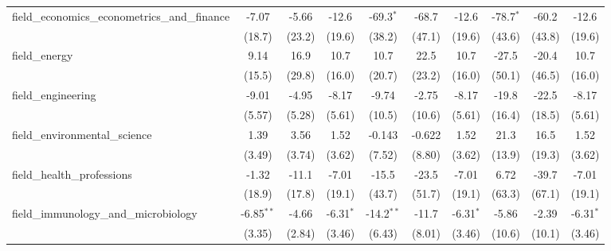 \begin{tabular}{lccccccccc}
   field\_economics\_econometrics\_and\_finance                & -7.07         & -5.66         & -12.6         & -69.3$^{*}$  & -68.7        & -12.6         & -78.7$^{*}$  & -60.2   & -12.6\\   
                                                               & (18.7)        & (23.2)        & (19.6)        & (38.2)       & (47.1)       & (19.6)        & (43.6)       & (43.8)  & (19.6)\\   
   field\_energy                                               & 9.14          & 16.9          & 10.7          & 10.7         & 22.5         & 10.7          & -27.5        & -20.4   & 10.7\\   
                                                               & (15.5)        & (29.8)        & (16.0)        & (20.7)       & (23.2)       & (16.0)        & (50.1)       & (46.5)  & (16.0)\\   
   field\_engineering                                          & -9.01         & -4.95         & -8.17         & -9.74        & -2.75        & -8.17         & -19.8        & -22.5   & -8.17\\   
                                                               & (5.57)        & (5.28)        & (5.61)        & (10.5)       & (10.6)       & (5.61)        & (16.4)       & (18.5)  & (5.61)\\   
   field\_environmental\_science                               & 1.39          & 3.56          & 1.52          & -0.143       & -0.622       & 1.52          & 21.3         & 16.5    & 1.52\\   
                                                               & (3.49)        & (3.74)        & (3.62)        & (7.52)       & (8.80)       & (3.62)        & (13.9)       & (19.3)  & (3.62)\\   
   field\_health\_professions                                  & -1.32         & -11.1         & -7.01         & -15.5        & -23.5        & -7.01         & 6.72         & -39.7   & -7.01\\   
                                                               & (18.9)        & (17.8)        & (19.1)        & (43.7)       & (51.7)       & (19.1)        & (63.3)       & (67.1)  & (19.1)\\   
   field\_immunology\_and\_microbiology                        & -6.85$^{**}$  & -4.66         & -6.31$^{*}$   & -14.2$^{**}$ & -11.7        & -6.31$^{*}$   & -5.86        & -2.39   & -6.31$^{*}$\\   
                                                               & (3.35)        & (2.84)        & (3.46)        & (6.43)       & (8.01)       & (3.46)        & (10.6)       & (10.1)  & (3.46)\\   

\end{tabular}
